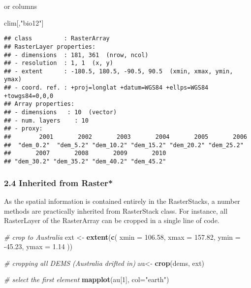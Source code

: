 \documentclass[]{article}
\newenvironment{Shaded}{\begin{snugshade}}{\end{snugshade}}
\newcommand{\CommentTok}[1]{\textcolor[rgb]{0.56,0.35,0.01}{\textit{#1}}}
\newcommand{\DataTypeTok}[1]{\textcolor[rgb]{0.13,0.29,0.53}{#1}}
\newcommand{\DecValTok}[1]{\textcolor[rgb]{0.00,0.00,0.81}{#1}}
\newcommand{\FloatTok}[1]{\textcolor[rgb]{0.00,0.00,0.81}{#1}}
\newcommand{\KeywordTok}[1]{\textcolor[rgb]{0.13,0.29,0.53}{\textbf{#1}}}
\newcommand{\NormalTok}[1]{#1}
\newcommand{\StringTok}[1]{\textcolor[rgb]{0.31,0.60,0.02}{#1}}
\begin{document}
or columns

\begin{Shaded}
\begin{Highlighting}[]
\NormalTok{clim[,}\StringTok{"bio12"}\NormalTok{]}
\end{Highlighting}
\end{Shaded}

\begin{verbatim}
## class         : RasterArray 
## RasterLayer properties: 
## - dimensions  : 181, 361  (nrow, ncol)
## - resolution  : 1, 1  (x, y)
## - extent      : -180.5, 180.5, -90.5, 90.5  (xmin, xmax, ymin, ymax)
## - coord. ref. : +proj=longlat +datum=WGS84 +ellps=WGS84 +towgs84=0,0,0 
## Array properties: 
## - dimensions   : 10  (vector)
## - num. layers    : 10
## - proxy:
##        2001       2002       2003       2004       2005       2006 
##  "dem_0.2"  "dem_5.2" "dem_10.2" "dem_15.2" "dem_20.2" "dem_25.2" 
##       2007       2008       2009       2010 
## "dem_30.2" "dem_35.2" "dem_40.2" "dem_45.2"
\end{verbatim}

\hypertarget{inherited-from-raster}{%
\subsubsection{2.4 Inherited from Raster*}\label{inherited-from-raster}}

As the spatial information is contained entirely in the RasterStacks, a
number methods are practically inherited from RasterStack class. For
instance, all RasterLayer of the RasterArray can be cropped in a single
line of code.

\begin{Shaded}
\begin{Highlighting}[]
\CommentTok{# crop to Australia}
\NormalTok{ext <-}\StringTok{ }\KeywordTok{extent}\NormalTok{(}\KeywordTok{c}\NormalTok{(                }
  \DataTypeTok{xmin =} \FloatTok{106.58}\NormalTok{,}
  \DataTypeTok{xmax =} \FloatTok{157.82}\NormalTok{,}
  \DataTypeTok{ymin =} \FloatTok{-45.23}\NormalTok{,}
  \DataTypeTok{ymax =} \FloatTok{1.14} 
\NormalTok{)) }

\CommentTok{# cropping all DEMS (Australia drifted in)}
\NormalTok{au<-}\StringTok{ }\KeywordTok{crop}\NormalTok{(dems, ext)}

\CommentTok{# select the first element}
\KeywordTok{mapplot}\NormalTok{(au[}\DecValTok{1}\NormalTok{], }\DataTypeTok{col=}\StringTok{"earth"}\NormalTok{)}
\end{Highlighting}
\end{Shaded}
\end{document}
